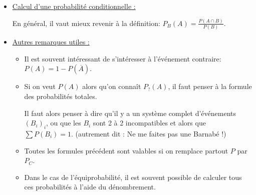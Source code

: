 \documentclass[french,12pt,twoside]{VcCours}
\begin{document}
\begin{itemize}
        $P\left(\bigcap_{i=1}^{+\infty}A_i\right)=\cas{\lim_{n\to+\infty}P(A_n)\ \textrm{si $(A_i)_i$ est une suite décroissante d'évts (continuité décroissante)}\\
        \lim_{n\to+\infty}P\left(\bigcap_{i=1}^nA_i\right)}$
  \item \underline{Calcul d'une probabilité conditionnelle :}
  
        En général, il vaut mieux revenir à la définition: $P_B(A)=\frac{P(A\cap B)}{P(B)}$.

  \vspace{-.5em}      
  \item \underline{Autres remarques utiles :}
  	\begin{itemize}
	  \item Il est souvent intéressant de s'intéresser à l'événement contraire: $P(A)=1-P(\overline{A})$.
	  \item Si on veut $P(A)$ alors qu'on connaît $P_?(A)$, il faut penser à la formule des probabilités totales.

              Il faut alors penser à dire qu'il y a un système complet d'événements $(B_i)_i$, ou que les $B_i$ sont 2 à 2 incompatibles et alors que $\sum P(B_i)=1$. (autrement dit : \og{} Ne me faites pas une Barnabé !\fg{})
	  \item Toutes les formules précédent sont valables si on remplace partout $P$ par $P_C$. 
	  \item Dans le cas de l'équiprobabilité, il est souvent possible de calculer tous ces probabilités à l'aide du dénombrement.
	\end{itemize}
                
  
\end{itemize}
\end{document}
